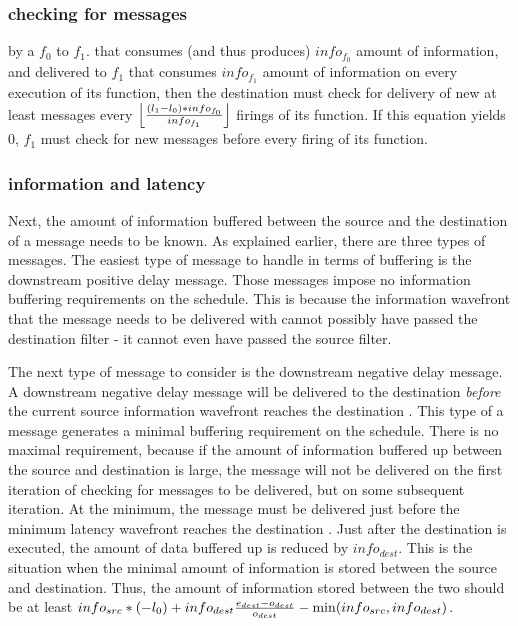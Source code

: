 \subsubsection{checking for messages}

 by a {\filter} $f_0$ to {\filter} $f_1$. that consumes
(and thus produces) $info_{f_0}$ amount of information, and
delivered to {\filter} $f_1$ that consumes $info_{f_1}$ amount of
information on every execution of its {\work} function, then the
destination {\filter} must check for delivery of new at least
messages every $\left \lfloor {(l_1-l_0)
* info_{f_0}} \over info_{f_1} \right \rfloor$ firings of its
{\work} function. If this equation yields 0, {\filter} $f_1$ must
check for new messages before every firing of its {\work} function.

%

\subsubsection{information and latency}

Next, the amount of information buffered between the source and
the destination of a message needs to be known.  As explained
earlier, there are three types of messages.  The easiest type of
message to handle in terms of buffering is the downstream positive
delay message.  Those messages impose no information buffering
requirements on the schedule.  This is because the information
wavefront that the message needs to be delivered with cannot
possibly have passed the destination filter - it cannot even have
passed the source filter.

The next type of message to consider is the downstream negative
delay message.  A downstream negative delay message will be
delivered to the destination \emph{before} the current source
{\filter} information wavefront reaches the destination {\filter}.
 This type of a message generates a minimal buffering requirement
on the schedule.  There is no maximal requirement, because if the
amount of information buffered up   between the source and
destination is large, the message will not be delivered on the
first iteration of checking for messages to be delivered, but on
some subsequent iteration.  At the minimum, the message must be
delivered just before the minimum latency wavefront reaches the
destination {\filter}.  Just after the destination {\filter} is
executed, the amount of data buffered up is reduced by
$info_{dest}$.  This is the situation when the minimal amount of
information is stored between the source and destination.  Thus,
the amount of information stored between the two {\filters} should
be at least $info_{src} * (-l_0) + info_{dest} {e_{dest} -
o_{dest} \over o_{dest}} - \min (info_{src}, info_{dest})$.


